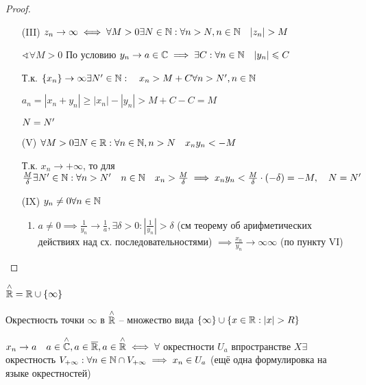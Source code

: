\begin{proof}
    \begin{itemize}
        \item [(III)] $z_n\to \infty  \iff  \forall M>0 \exists N\in \N : \forall n>N, n\in \N \quad |z_n|>M$

            $\sphericalangle \forall M>0$ По условию $y_{n} \to a\in \mathbb{C} \implies  \exists C: \forall n\in \mathbb{N} \quad |y_{n} |\leqslant C$

            Т.к. $\{x_{n} \} \to \infty \exists N^{\prime}\in \mathbb{N} :\quad x_{n} >M+C \forall n>N^{\prime}, n\in \mathbb{N} $

            $a_n = |x_{n} +y_{n} | \geqslant  |x_{n} | - |y_{n} | >M+C-C = M$

            $N = N^{\prime}$
        \item [(V)] $\forall M>0 \exists N\in \mathbb{R}: \forall n\in \mathbb{N} , n>N\quad x_{n} y_{n} <-M$

            Т.к. $x_{n} \to +\infty $, то для  $\frac{M}{\delta} \exists N^{\prime}\in \mathbb{N} : \forall n>N^{\prime}\quad n\in \mathbb{N} \quad x_{n} >\frac{M}{\delta} \implies  x_{n}y_{n} <\frac{M}{\delta}\cdot (-\delta) = -M, \quad N = N^{\prime}$ 
        \item[(IX)] $y_{n} \neq 0 \forall n\in \mathbb{N} $
            \begin{enumerate}
                \item $a\neq 0 \implies \frac{1}{y_{n} }\to \frac{1}{a}, \exists \delta >0: \left| \frac{1}{y_{n} } \right| >\delta$ (см теорему об арифметических действиях над сх. последовательностями) $\implies \frac{x_{n} }{y_{n} } \to \infty \infty $ (по пункту VI)
            \end{enumerate}
    \end{itemize}
\end{proof}

$\overset{\land}{\mathbb{R}} = \mathbb{R}\cup \{\infty \}$

Окрестность точки $\infty $ в $\overset{\land}{\mathbb{R}}$ -- множество вида $\{\infty \}\cup \{x\in \R:|x|>R\}$

\begin{note}
    $x_{n} \to a\quad a\in \overset{\land}{\mathbb{C}}, a\in \overline{\mathbb{R}}, a\in \overset{\land}{\mathbb{R}} \iff  \forall $ окрестности $U_a$  впространстве  $X \exists $ окрестность $V_{+\infty }: \forall n\in \mathbb{N} \cap V_{+\infty } \implies  x_{n} \in U_a$ (ещё одна формулировка на языке окрестностей)
\end{note}

